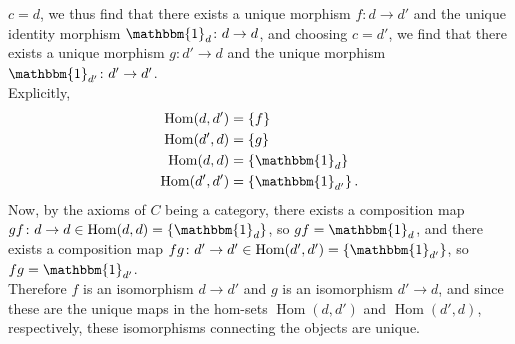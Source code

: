 \documentclass[a4paper]{article}
\DeclareMathOperator{\Hom}{Hom}
\begin{document}
     $c = d$, we thus find that there exists
     a unique morphism $f  \colon d \to d'$ and
     the unique identity morphism
     $\mathbbm{1}_d  \colon d \to d$, and
     choosing $c = d'$, we find that there exists a unique
     morphism $g  \colon d' \to d$ and
     the unique morphism $ \mathbbm{1}_{d'}
      \colon d' \to d'$.\\
      Explicitly,
      \begin{align*}
          \Hom (d,d') &= \left\{ f \right\}\\
          \Hom (d',d) &= \left\{ g \right\}\\
          \Hom (d,d) &= \left\{ \mathbbm{1}_d \right\}\\
          \Hom (d',d') &= \left\{ \mathbbm{1}_{d'} \right\}.
      \end{align*}
      Now, by the axioms of $C$ being a category, there
      exists a composition map
      $gf  \colon d \to d \in \Hom (d,d) = \left\{ \mathbbm{1}_d \right\} $,
      so $gf = \mathbbm{1}_{d}$, and
      there exists a composition map
       $fg  \colon d' \to d' \in 
       \Hom (d',d') = \left\{ \mathbbm{1}_{d'} \right\} $, so
       $fg = \mathbbm{1}_{d'}$.\\
       Therefore $f$ is an isomorphism $d \to d'$ and
        $g$ is an isomorphism $d' \to d$,
        and since these are the unique maps
        in the hom-sets $\Hom(d,d')$ and
        $\Hom (d',d)$, respectively, these isomorphisms
        connecting the objects
        are unique.
\end{document}
